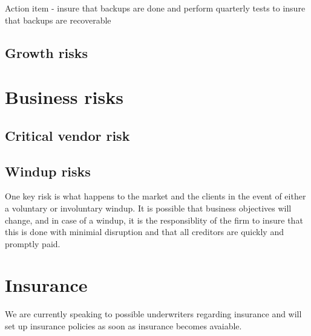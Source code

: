 Action item - insure that backups are done and perform quarterly tests
to insure that backups are recoverable

\subsection{Growth risks}

\section{Business risks}
\subsection{Critical vendor risk}
\subsection{Windup risks}

One key risk is what happens to the market and the clients in the
event of either a voluntary or involuntary windup.  It is possible
that business objectives will change, and in case of a windup, it is
the responsiblity of the firm to insure that this is done with
minimial disruption and that all creditors are quickly and promptly
paid.

\section{Insurance}

We are currently speaking to possible underwriters regarding insurance
and will set up insurance policies as soon as insurance becomes
avaiable.
